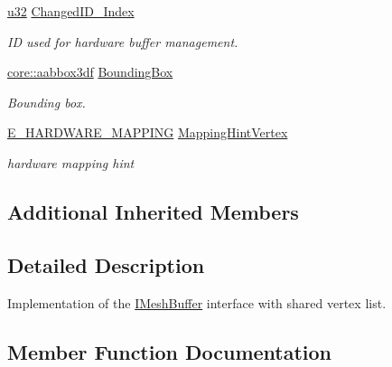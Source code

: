 \begin{DoxyCompactItemize}
\mbox{\label{structirr_1_1scene_1_1SSharedMeshBuffer_a854d104dc67995a49f65c902195e9d5f}} 
\hyperlink{namespaceirr_a0416a53257075833e7002efd0a18e804}{u32} \hyperlink{structirr_1_1scene_1_1SSharedMeshBuffer_a854d104dc67995a49f65c902195e9d5f}{Changed\+I\+D\+\_\+\+Index}
\begin{DoxyCompactList}\small\item\em ID used for hardware buffer management. \end{DoxyCompactList}\item 
\mbox{\label{structirr_1_1scene_1_1SSharedMeshBuffer_a98dc504864fb163b0628a658fa9897b5}} 
\hyperlink{namespaceirr_1_1core_a60f4b4c744aba55f10530d503c6ecb04}{core\+::aabbox3df} \hyperlink{structirr_1_1scene_1_1SSharedMeshBuffer_a98dc504864fb163b0628a658fa9897b5}{Bounding\+Box}
\begin{DoxyCompactList}\small\item\em Bounding box. \end{DoxyCompactList}\item 
\mbox{\label{structirr_1_1scene_1_1SSharedMeshBuffer_a9e78b3a22c91f6c0681335d0a71367e2}} 
\hyperlink{namespaceirr_1_1scene_ac7d8ee8d77da75f2580bb9bb17231c27}{E\+\_\+\+H\+A\+R\+D\+W\+A\+R\+E\+\_\+\+M\+A\+P\+P\+I\+NG} \hyperlink{structirr_1_1scene_1_1SSharedMeshBuffer_a9e78b3a22c91f6c0681335d0a71367e2}{Mapping\+Hint\+Vertex}
\begin{DoxyCompactList}\small\item\em hardware mapping hint \end{DoxyCompactList}\end{DoxyCompactItemize}
\subsection*{Additional Inherited Members}


\subsection{Detailed Description}
Implementation of the \hyperlink{classirr_1_1scene_1_1IMeshBuffer}{I\+Mesh\+Buffer} interface with shared vertex list. 

\subsection{Member Function Documentation}
\mbox{\label{structirr_1_1scene_1_1SSharedMeshBuffer_a0a37d52f7ec9917d9ca0d9dd908917b9}} 
